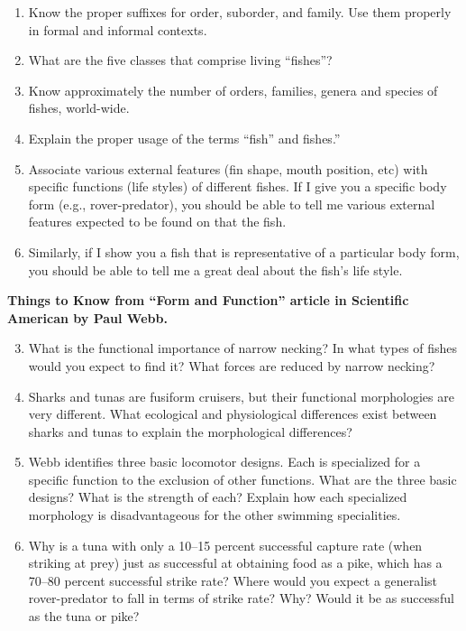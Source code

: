\documentclass[letterpaper]{tufte-handout}
\begin{document}
\begin{enumerate}
	\item Know the proper suffixes for order, suborder, and family. Use them properly in formal and informal contexts.

	\item What are the five classes that comprise living “fishes”?

	\item Know approximately the number of orders, families, genera and species of fishes, world-wide.

	\item Explain the proper usage of the terms “fish” and fishes.”

	\item Associate various external features (fin shape, mouth position, etc) with specific functions (life styles) of different fishes.  If I give you a specific body form (e.g., rover-predator), you should be able to tell me various external features expected to be found on that the fish.
	
	\item Similarly, if I show you a fish that is representative of a particular body form, you should be able to tell me a great deal about the fish’s life style.  
\end{enumerate}

\noindent\textbf{Things to Know from “Form and Function” article in Scientific American by Paul Webb.}

\begin{enumerate}
	\setcounter{enumi}{2}
	\item What is the functional importance of narrow necking?  In what types of fishes would you expect to find it?  What forces are reduced by narrow necking?
	
	\item Sharks and tunas are fusiform cruisers, but their functional morphologies are very different.  What ecological and physiological differences exist between sharks and tunas to explain the morphological differences?
	
	\item Webb identifies three basic locomotor designs.  Each is specialized for a specific function to the exclusion of other functions.  What are the three basic designs?  What is the strength of each?  Explain how each specialized morphology is disadvantageous for the other swimming specialities.
	
	\item Why is a tuna with only a 10--15 percent successful capture rate (when striking at prey) just as successful at obtaining food as a pike, which has a 70--80 percent successful strike rate?  Where would you expect a generalist rover-predator to fall in terms of strike rate?  Why?  Would it be as successful as the tuna or pike?
\end{enumerate}
\end{document}
